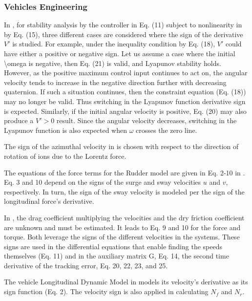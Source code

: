 \documentclass[11pt]{book}
\begin{document}

\subsubsection{Vehicles Engineering}

In \cite{bang2003large}, for stability analysis by the controller
in Eq. (11) subject to nonlinearity in by Eq. (15), three different
cases are considered where the sign of the derivative $V'$ is studied.
For example, under the inequality condition by Eq. (18), $V'$ could
have either a positive or negative sign. Let us assume a case where
the initial \textbackslash omega is negative, then Eq. (21) is valid,
and Lyapunov stability holds. However, as the positive maximum control
input continues to act on, the angular velocity tends to increase
in the negative direction further with decreasing quaternion. If such
a situation continues, then the constraint equation (Eq. (18)) may
no longer be valid. Thus switching in the Lyapunov function derivative
sign is expected. Similarly, if the initial angular velocity is positive,
Eq. (20) may also produce a $V'>0$ result. Since the angular velocity
decreases, switching in the Lyapunov function is also expected when
$\omega$ crosses the zero line.

The sign of the azimuthal velocity in \cite{bourgeois2010unexpected}
is chosen with respect to the direction of rotation of ions due to
the Lorentz force.

The equations of the force terms for the Rudder model are given in
Eq. 2-10 in \cite{apri2011analysis}. Eq. 3 and 10 depend on the signs
of the surge and sway velocities $u$ and $v$, respectively. In turn,
the sign of the sway velocity is modeled per the sign of the longitudinal
force's derivative.

In \cite{cabecinhas2017hovercraft}, the drag coefficient multiplying
the velocities and the dry friction coefficient are unknown and must
be estimated. It leads to Eq. 9 and 10 for the force and torque. Both
leverage the signs of the different velocities in the systems. These
signs are used in the differential equations that enable finding the
speeds themselves (Eq. 11) and in the auxiliary matrix G, Eq. 14,
the second time derivative of the tracking error, Eq. 20, 22, 23,
and 25.

The vehicle Longitudinal Dynamic Model in \cite{fukuda2017basic}
models its velocity's derivative as its sign function (Eq. 2). The
velocity sign is also applied in calculating $N_{f}$ and $N_{r}$.
\end{document}
